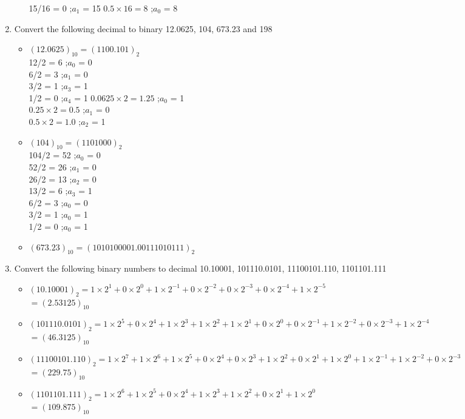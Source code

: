 \documentclass[12pt]{article}
\begin{document}
\begin{enumerate}
\begin{itemize}
		15/16 = 0  ;$a_1$ = 15
		\bigbreak
		$0.5 \times 16 = 8$  ;$a_0$ = 8
	\end{itemize}
	\item Convert the following decimal	to binary 12.0625, 104, 673.23 and 198
	\begin{itemize}
		\item $(12.0625)_{10} = (1100.101)_2$\\
		12/2 = 6  ;$a_0$ = 0\\
		6/2 = 3  ;$a_1$ = 0\\
		3/2 = 1  ;$a_3$ = 1\\
		1/2 = 0  ;$a_4$ = 1
		\bigbreak
		$0.0625 \times 2 = 1.25$  ;$a_0$ = 1\\
		$0.25 \times 2 = 0.5$  ;$a_1$ = 0\\
		$0.5 \times 2 = 1.0$  ;$a_2$ = 1
		\item $(104)_{10} = (1101000)_2$\\
		104/2 = 52  ;$a_0$ = 0\\
		52/2 = 26  ;$a_1$ = 0\\
		26/2 = 13  ;$a_2$ = 0\\
		13/2 = 6  ;$a_3$ = 1\\
		6/2 = 3  ;$a_0$ = 0\\
		3/2 = 1  ;$a_0$ = 1\\
		1/2 = 0  ;$a_0$ = 1
		\item $(673.23)_{10} = (1010100001.00111010111)_2$\\
	\end{itemize}
	\item Convert the following binary numbers to decimal 10.10001, 101110.0101, 11100101.110, 1101101.111
	\begin{itemize}
		\item $(10.10001)_2 = 1 \times 2^1 + 0 \times 2^0 + 1 \times 2^{-1} + 0 \times 2^{-2} + 0 \times 2^{-3} + 0 \times 2^{-4} + 1 \times 2^{-5}$\\
		$= (2.53125)_{10}$
		\item $(101110.0101)_2 = 1 \times 2^5 + 0 \times 2^4 + 1 \times 2^3 + 1 \times 2^2 + 1 \times 2^1 + 0 \times 2^0 + 0 \times 2^{-1} + 1 \times 2^{-2} + 0 \times 2^{-3} + 1 \times 2^{-4}$\\
		$ = (46.3125)_{10}$
		\item $(11100101.110)_2 = 1 \times 2^7 + 1 \times 2^6 + 1 \times 2^5 + 0 \times 2^4 + 0 \times 2^3 + 1 \times 2^2 + 0 \times 2^1 + 1 \times 2^0 + 1 \times 2^{-1} + 1 \times 2^{-2} + 0 \times 2^{-3}$\\
		$= (229.75)_{10}$
		\item $(1101101.111)_2 = 1 \times 2^6 + 1 \times 2^5 + 0 \times 2^4 + 1 \times 2^3 + 1 \times 2^2 + 0 \times 2^1 + 1 \times 2^0$\\
		$= (109.875)_{10}$ 
	\end{itemize}
\end{enumerate}
\end{document}
